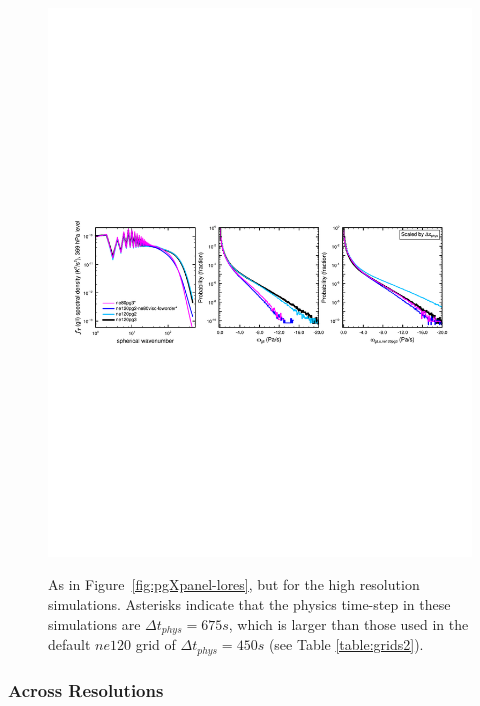 \documentclass{agujournal}
\begin{document}
\begin{figure}[t]
\begin{center}
\noindent\includegraphics[width=30pc,angle=0]{figs/panel_ne80pg3_ne120pg2_ne120pg3.pdf}\\
\end{center}
\caption{As in Figure~\ref{fig:pgXpanel-lores}, but for the high resolution simulations. Asterisks indicate that the physics time-step in these simulations are $\Delta t_{phys} = 675 s$, which is larger than those used in the default $ne120$ grid of $\Delta t_{phys} = 450 s$ (see Table \ref{table:grids2}).}
\label{fig:pgXpanel-hires}
\end{figure}

\subsubsection{Across Resolutions}\label{sec:allres}
\end{document}
